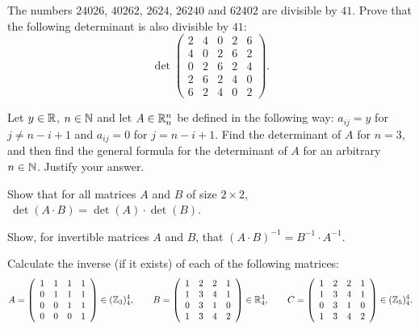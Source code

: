 \begin{exercise}
The numbers $24026$, $40262$, $2624$, $26240$ and $62402$ are divisible by $41$. Prove that the following
determinant is also divisible by $41$:
\[
\det \left( \begin{array}{ccccc}
2 & 4 & 0 & 2 & 6\\
4 & 0 & 2 & 6 & 2\\
0 & 2 & 6 & 2 & 4\\
2 & 6 & 2 & 4 & 0\\
6 & 2 & 4 & 0 & 2
\end{array} \right).
\]
\end{exercise}

\begin{exercise}
Let $y\in\mathbb{R}$, $n\in\mathbb{N}$ and let $A\in\mathbb{R}_n^n$ be defined in the following way: $a_{ij} = y$ for
$j\neq n-i+1$ and $a_{ij} = 0$ for $j = n-i+1$. Find the determinant of $A$ for $n=3$, and then find the
general formula for the determinant of $A$ for an arbitrary $n\in\mathbb{N}$. Justify your answer.
\end{exercise}

\begin{exercise}
Show that for all matrices $A$ and $B$ of size $2\times 2$, $\ \det(A\cdot B) = \det(A)\cdot\det(B)$.
\end{exercise}

\begin{exercise}
Show, for invertible matrices $A$ and $B$, that $(A\cdot B)^{-1} = B^{-1}\cdot A^{-1}$.
\end{exercise}

\begin{exercise}
Calculate the inverse (if it exists) of each of the following matrices:
\[
A = \left( \begin{array}{cccc}
1 & 1 & 1 & 1\\ 0 & 1 & 1 & 1\\ 0 & 0 & 1 & 1\\ 0 & 0 & 0 & 1
\end{array} \right) \in (\mathbb{Z}_3)_4^4, \qquad
B = \left( \begin{array}{cccc}
1 & 2 & 2 & 1\\ 1 & 3 & 4 & 1\\ 0 & 3 & 1 & 0\\ 1 & 3 & 4 & 2
\end{array} \right) \in \mathbb{R}_4^4, \qquad
C = \left( \begin{array}{cccc}
1 & 2 & 2 & 1\\ 1 & 3 & 4 & 1\\ 0 & 3 & 1 & 0\\ 1 & 3 & 4 & 2
\end{array} \right) \in (\mathbb{Z}_5)_4^4.
\]
\end{exercise}
